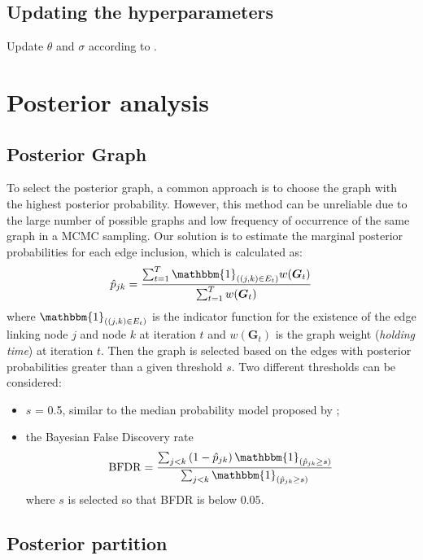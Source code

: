 \subsection{Updating the hyperparameters}

Update $\theta$ and $\sigma$ according to \textcite[835-836]{martinezNonparametricChangePoint2014}.


\section{Posterior analysis}


\subsection{Posterior Graph}

To select the posterior graph, a common approach is to choose the graph with the highest posterior probability. However, this method can be unreliable due to the large number of possible graphs and low frequency of occurrence of the same graph in a MCMC sampling. Our solution is to estimate the marginal posterior probabilities for each edge inclusion, which is calculated as:
\[
    \hat{p}_{j k}=\frac{\sum_{t=1}^T \mathbbm{1}_{((j, k) \in E_t)} w(\boldsymbol{G}_t)}{\sum_{t=1}^T w(\boldsymbol{G}_t)}
\]
where $\mathbbm{1}_{\left((j, k) \in E_t\right)}$ is the indicator function for the existence of the edge linking node $j$ and node $k$ at iteration $t$ and $w(\boldsymbol{G}_t)$ is the graph weight (\emph{holding time}) at iteration $t$.
Then the graph is selected based on the edges with posterior probabilities greater than a given threshold $s$. 
Two different thresholds can be considered:
\begin{itemize}
    \item $s$ = 0.5, similar to the median probability model proposed by \textcite{Barbieri2004Optimal};
    \item the Bayesian False Discovery rate \parencite[BFDR;][]{Mller2006FDRAB}
    \[
        \operatorname{BFDR}=\frac{\sum_{j<k}\left(1-\hat{p}_{j k}\right) \mathbbm{1}_{\left(\hat{p}_{j k} \geq s\right)}}{\sum_{j<k} \mathbbm{1}_{\left(\hat{p}_{j k} \geq s\right)}}
    \]
where $s$ is selected so that BFDR is below $0.05$.

\end{itemize}

\subsection{Posterior partition}

